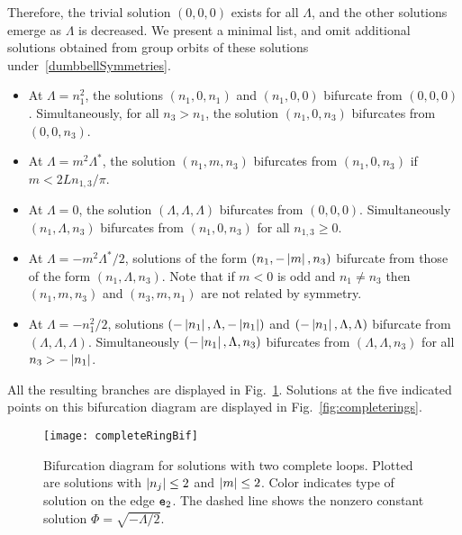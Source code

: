 \documentclass{article}
\numberwithin{equation}{section}
\numberwithin{figure}{section}
\begin{document}
Therefore, the trivial solution $(0,0,0)$ exists for all $\Lambda$, and the other solutions emerge as $\Lambda$ is decreased. We present a minimal list, and omit additional solutions obtained from group orbits of these solutions under~\eqref{dumbbellSymmetries}.
\begin{itemize}
\item At $\Lambda = n_1^2$, the solutions $(n_1,0,n_1)$ and $(n_1,0,0)$ bifurcate from $(0,0,0)$. Simultaneously, for all $n_3>n_1$, the solution $(n_1,0,n_3)$ bifurcates from $(0,0,n_3)$.
\item At $\Lambda = m^2 \Lambda^*$, the solution $(n_1,m,n_3)$ bifurcates from $(n_1,0,n_3)$ if $m < 2 L n_{1,3}/\pi$.
\item At $\Lambda = 0$, the solution $(\Lambda,\Lambda,\Lambda)$ bifurcates from $(0,0,0)$. Simultaneously $(n_1,\Lambda,n_3)$ bifurcates from $(n_1,0,n_3)$ for all $n_{1,3}\ge 0$.
\item At $\Lambda = -m^2 \Lambda^*/2$, solutions of the form $(n_1,-\left\lvert m\right\rvert,n_3)$ bifurcate from those of the form $(n_1,\Lambda,n_3)$. Note that if $m<0$ is odd and $n_1 \neq n_3$ then $(n_1,m,n_3)$ and $(n_3,m,n_1)$ are not related by symmetry.
\item At $\Lambda = -n_1^2/2$, solutions $(-\left\lvert n_1\right\rvert,\Lambda,-\left\lvert n_1\right\rvert)$ and $(-\left\lvert n_1\right\rvert,\Lambda,\Lambda)$ bifurcate from $(\Lambda,\Lambda,\Lambda)$.  Simultaneously $(-\left\lvert n_1\right\rvert,\Lambda,n_3)$ bifurcates from $(\Lambda,\Lambda,n_3)$ for all $n_3>-\left\lvert n_1\right\rvert$.
\end{itemize}
All the resulting branches are displayed in Fig.~\ref{fig:ohmygod}. Solutions at the five indicated points on this bifurcation diagram are displayed in Fig.~\ref{fig:completerings}. 

\begin{figure}[htbp] %
   \centering
   \texttt{[image: completeRingBif]} 
   \caption{Bifurcation diagram for solutions with two complete loops. Plotted are solutions with $\left\lvert n_j\right\rvert\le 2$ and $\left\lvert m\right\rvert\le2$. Color indicates type of solution on the edge $\mathtt{e}_2$. The dashed line shows the nonzero constant solution $\Phi = \sqrt{-\Lambda/2}$.}
\label{fig:ohmygod}
\end{figure}
\end{document}
